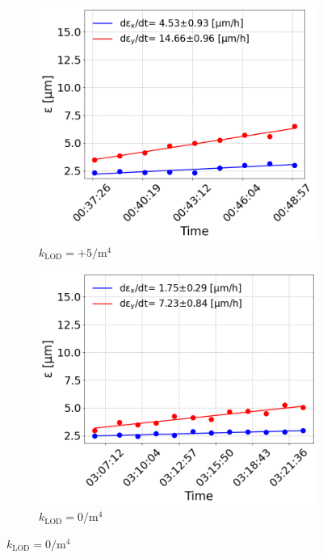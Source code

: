 \begin{figure}[htp]
\begin{subfigure}{.45\textwidth}
    \end{subfigure}
    \begin{subfigure}{.45\textwidth}
        \centering
        \includegraphics[width=.95\linewidth]{images/app_c/emit_vs_time_Set1_coast3.png}  
        \caption{$k_\mathrm{LOD}=+5  \mathrm{/m^{4}}$}
    \end{subfigure}
    \begin{subfigure}{.45\textwidth}
            \centering
            \includegraphics[width=.95\linewidth]{images/app_c/emit_vs_time_Set1_coast4.png}  
            \caption{$k_\mathrm{LOD}=0  \mathrm{/m^{4}}$}
    \end{subfigure}

\end{figure}

